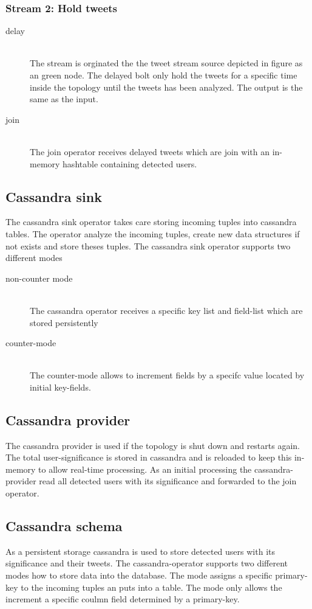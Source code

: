 \subsubsection{Stream 2: Hold tweets}
\begin{description}
  \item[delay] \hfill \\
      The stream is orginated the the tweet stream source depicted in figure as an green node. The delayed bolt only hold the tweets for a specific time inside the topology until the tweets has been analyzed. The output is the same as the input.

  \item[join] \hfill \\
	The join operator receives delayed tweets which are join with an in-memory hashtable containing detected users.
\end{description}

\subsection{Cassandra sink}
The cassandra sink operator takes care storing incoming tuples into cassandra tables. The operator analyze the incoming tuples, create new data structures if not exists and store theses tuples. The cassandra sink operator supports two different modes
\begin{description}
  \item[non-counter mode] \hfill \\
	The cassandra operator receives a specific key list and field-list which are stored persistently 
  \item[counter-mode] \hfill \\
       The counter-mode allows to increment fields by a specifc value located by initial key-fields.
\end{description}


\subsection{Cassandra provider}

The cassandra provider is used if the topology is shut down and restarts again. The total user-significance is stored in cassandra and is reloaded to keep this in-memory to allow real-time processing. As an initial processing the cassandra-provider read all detected users with its significance and forwarded to the join operator. 

\subsection{Cassandra schema}
As a persistent storage cassandra is used to store detected users with its significance and their tweets. The cassandra-operator supports two different modes how to store data into the database. The  mode assigns a specific primary-key to the incoming tuples an puts into a table. The  mode only allows the increment a specific coulmn field determined by a primary-key.  

